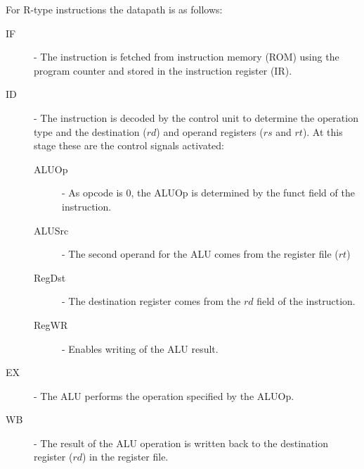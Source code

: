 \documentclass[12pt letter]{report}
\begin{document}
For R-type instructions the datapath is as follows:
\begin{description}
  \item[IF]  - The instruction is fetched from instruction memory (ROM) using the program counter and stored in the instruction register (IR).
  \item[ID] - The instruction is decoded by the control unit to determine the operation type and the destination ($rd$) and operand registers ($rs$ and $rt$). At this stage these are the control signals activated:
        \begin{description}
          \item[ALUOp] - As opcode is 0, the ALUOp is determined by the funct field of the instruction.
          \item[ALUSrc] - The second operand for the ALU comes from the register file ($rt$)
          \item[RegDst] - The destination register comes from the $rd$ field of the instruction.
          \item[RegWR] - Enables writing of the ALU result.
        \end{description}
  \item[EX] - The ALU performs the operation specified by the ALUOp.
  \item[WB] - The result of the ALU operation is written back to the destination register ($rd$) in the register file.
\end{description}
\end{document}
